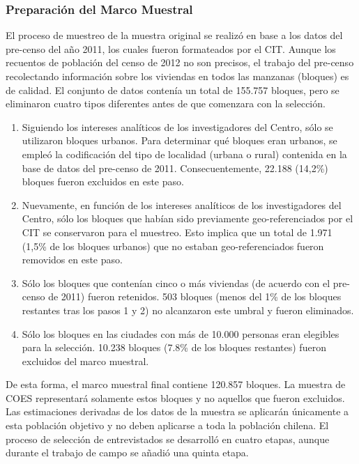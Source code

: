 \documentclass[
  12pt,
]{article}
\begin{document}
\hypertarget{preparaciuxf3n-del-marco-muestral}{%
\subsubsection*{Preparación del Marco Muestral}\label{preparaciuxf3n-del-marco-muestral}}

El proceso de muestreo de la muestra original se realizó en base a los datos del pre-censo del año 2011, los cuales fueron formateados por el CIT. Aunque los recuentos de población del censo de 2012 no son precisos, el trabajo del pre-censo recolectando información sobre los viviendas en todos las manzanas (bloques) es de calidad. El conjunto de datos contenía un total de 155.757 bloques, pero se eliminaron cuatro tipos diferentes antes de que comenzara con la selección.

\begin{enumerate}
\def\labelenumi{\arabic{enumi}.}
\item
  Siguiendo los intereses analíticos de los investigadores del Centro, sólo se utilizaron bloques urbanos. Para determinar qué bloques eran urbanos, se empleó la codificación del tipo de localidad (urbana o rural) contenida en la base de datos del pre-censo de 2011. Consecuentemente, 22.188 (14,2\%) bloques fueron excluidos en este paso.
\item
  Nuevamente, en función de los intereses analíticos de los investigadores del Centro, sólo los bloques que habían sido previamente geo-referenciados por el CIT se conservaron para el muestreo. Esto implica que un total de 1.971 (1,5\% de los bloques urbanos) que no estaban geo-referenciados fueron removidos en este paso.
\item
  Sólo los bloques que contenían cinco o más viviendas (de acuerdo con el pre-censo de 2011) fueron retenidos. 503 bloques (menos del 1\% de los bloques restantes tras los pasos 1 y 2) no alcanzaron este umbral y fueron eliminados.
\item
  Sólo los bloques en las ciudades con más de 10.000 personas eran elegibles para la selección. 10.238 bloques (7.8\% de los bloques restantes) fueron excluidos del marco muestral.
\end{enumerate}

De esta forma, el marco muestral final contiene 120.857 bloques. La muestra de COES representará solamente estos bloques y no aquellos que fueron excluidos. Las estimaciones derivadas de los datos de la muestra se aplicarán únicamente a esta población objetivo y no deben aplicarse a toda la población chilena. El proceso de selección de entrevistados se desarrolló en cuatro etapas, aunque durante el trabajo de campo se añadió una quinta etapa.
\end{document}
